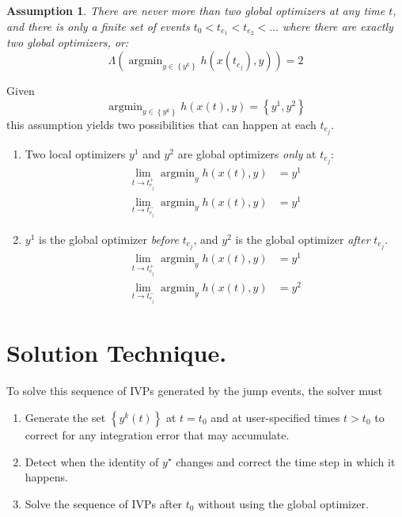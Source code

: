\documentclass[twoside,leqno,twocolumn]{article}
\DeclareMathOperator*{\argmin}{\arg\min}
\newtheorem{assumption}{Assumption}[section]
\begin{document}
\begin{assumption}
	\label{assume:events-exist}
	There are never more than two global optimizers at any time $t$, and there is only a finite set of events $t_0 < t_{e_1} < t_{e_2} < \ldots$ where there are exactly two global optimizers, or:
	\begin{equation*}
		\Lambda\left(\argmin_{y\in\left\{y^k\right\}}h(x(t_{e_j}), y)\right) = 2
	\end{equation*}
\end{assumption}
Given 
\begin{equation*}
	\argmin_{y\in\left\{y^k\right\}} h(x(t), y) = \left\{y^1, y^2\right\}
\end{equation*}
this assumption yields two possibilities that can happen at each $t_{e_j}$. 
\begin{enumerate}
	\item Two local optimizers $y^1$ and $y^2$ are global optimizers \textit{only} at $t_{e_j}$:
	\begin{equation*}
		\begin{aligned}
			\lim_{t\to t_{e_j}^+} \argmin_{y} h(x(t), y) &= y^1\\
			\lim_{t\to t_{e_j}^-} \argmin_{y} h(x(t), y) &= y^1
		\end{aligned}
	\end{equation*}
	\item $y^1$ is the global optimizer \textit{before} $t_{e_j}$, and $y^2$ is the global optimizer \textit{after} $t_{e_j}$.
	\begin{equation*}
		\begin{aligned}
			\lim_{t\to t_{e_j}^+} \argmin_{y} h(x(t), y) &= y^1\\
			\lim_{t\to t_{e_j}^-} \argmin_{y} h(x(t), y) &= y^2
		\end{aligned}
	\end{equation*}
\end{enumerate}

\section{Solution Technique.}
To solve this sequence of IVPs generated by the jump events, the solver must 
\begin{enumerate}
	\item Generate the set $\left\{y^k(t)\right\}$ at $t=t_0$ and at user-specified times $t>t_0$ to correct for any integration error that may accumulate.
	\item Detect when the identity of $y^\star$ changes and correct the time step in which it happens.
	\item Solve the sequence of IVPs after $t_0$ without using the global optimizer.
\end{enumerate}
\end{document}
